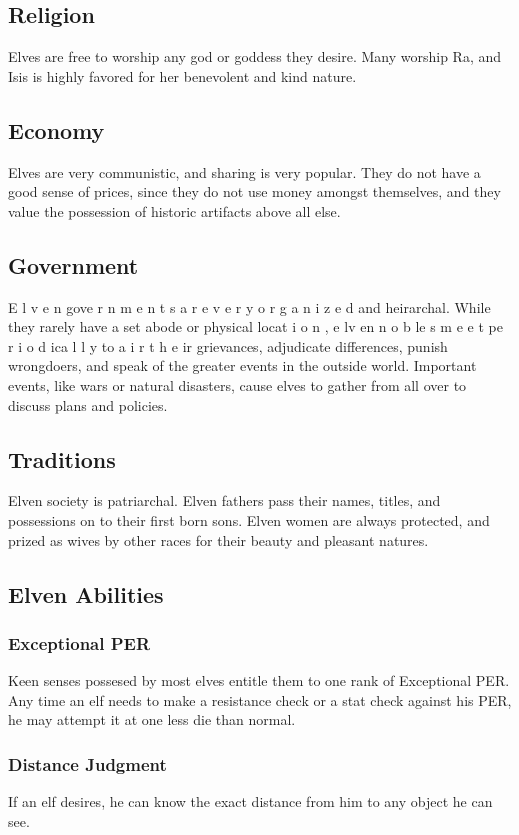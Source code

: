 \begin{multicols*}{2}
\subsection{Religion}
Elves are free to worship any god or goddess they
desire. Many worship Ra, and Isis is highly favored for her
benevolent and kind nature.
\subsection{Economy}
Elves are very communistic, and sharing is very
popular. They do not have a good sense of prices, since they
do not use money amongst themselves, and they value the
possession of historic artifacts above all else.
\subsection{Government}
E l v e n gove r n m e n t s a r e v e r y o r g a n i z e d and
heirarchal. While they rarely have a set abode or physical
locat i o n , e lv en n o b le s m e e t pe r i o d ica l l y to a i r t h e ir
grievances, adjudicate differences, punish wrongdoers, and
speak of the greater events in the outside world. Important
events, like wars or natural disasters, cause elves to gather
from all over to discuss plans and policies.
\subsection{Traditions}
Elven society is patriarchal. Elven fathers pass their
names, titles, and possessions on to their first born sons.
Elven women are always protected, and prized as wives by
other races for their beauty and pleasant natures.
\subsection{Elven Abilities}
\subsubsection{Exceptional PER}
Keen senses possesed by most elves entitle them to
one rank of Exceptional PER. Any time an elf needs to make
a resistance check or a stat check against his PER, he may
attempt it at one less die than normal.
\subsubsection{Distance Judgment}
If an elf desires, he can know the exact distance
from him to any object he can see.

\end{multicols*}
